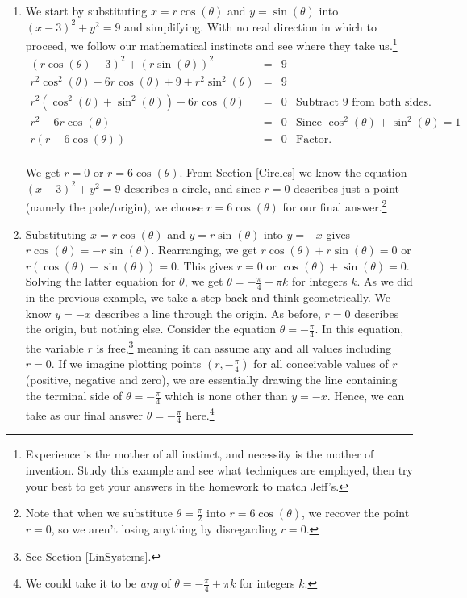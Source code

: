 \begin{ex}
\begin{enumerate}
\begin{enumerate}

\item We start by substituting  $x = r\cos(\theta)$ and $y = \sin(\theta)$ into $(x-3)^2 + y^2 = 9$ and simplifying.  With no real direction in which to proceed, we follow our mathematical instincts and see where they take us.\footnote{Experience is the mother of all instinct, and necessity is the mother of invention.  Study this example and see what techniques are employed, then try your best to get your answers in the homework to match Jeff's.}
\[ \begin{array}{rclr}

(r\cos(\theta) - 3)^2+ (r\sin(\theta))^2 & = & 9& \\[3pt]
r^2\cos^2(\theta) - 6 r\cos(\theta) + 9 + r^2 \sin^{2}(\theta) & = &  9 \\[3pt]
r^2\left(\cos^2(\theta) + \sin^{2}(\theta)\right) - 6 r\cos(\theta) & = & 0 & \text{Subtract $9$ from both sides.}\\[3pt]
r^2 - 6 r\cos(\theta) & = & 0 & \text{Since $\cos^2(\theta) + \sin^2(\theta) = 1$} \\[3pt]
r(r - 6 \cos(\theta)) & = & 0 &  \text{Factor.} \\ \end{array} \]

We get $r = 0$ or $r = 6\cos(\theta)$.  From Section \ref{Circles} we know the equation $(x-3)^2 + y^2 = 9$ describes a circle, and since $r=0$ describes just a point (namely the pole/origin), we choose $r = 6\cos(\theta)$ for our final answer.\footnote{Note that when we substitute $\theta = \frac{\pi}{2}$ into $r = 6\cos(\theta)$,  we recover the point $r = 0$, so we aren't losing anything by disregarding $r=0$.}

\item  Substituting $x = r\cos(\theta)$ and $y = r\sin(\theta)$ into $y=-x$ gives $r\cos(\theta)= -r\sin(\theta)$. Rearranging, we get  $r\cos(\theta) + r\sin(\theta) = 0$ or $r(\cos(\theta) + \sin(\theta)) = 0$.  This gives $r=0$ or $\cos(\theta) + \sin(\theta) = 0$.  Solving the latter equation for $\theta$, we get $\theta = -\frac{\pi}{4} + \pi k$ for integers $k$. As we did in the previous example, we take a step back and think geometrically. We know $y=-x$ describes a line through the origin.  As before, $r=0$ describes the origin, but nothing else.  Consider the equation $\theta = -\frac{\pi}{4}$.  In this equation, the variable $r$ is free,\footnote{See Section \ref{LinSystems}.} meaning it can assume any and all values including $r=0$. If we imagine plotting points $(r, -\frac{\pi}{4})$  for all conceivable values of $r$ (positive, negative and zero), we are essentially drawing the line containing the terminal side of $\theta = -\frac{\pi}{4}$ which is none other than $y = -x$.  Hence, we can take as our final answer   $\theta = -\frac{\pi}{4}$ here.\footnote{We could take it to be \textit{any} of $\theta = -\frac{\pi}{4} + \pi k$ for integers $k$.} 


\end{enumerate}
\end{enumerate}
\end{ex}
